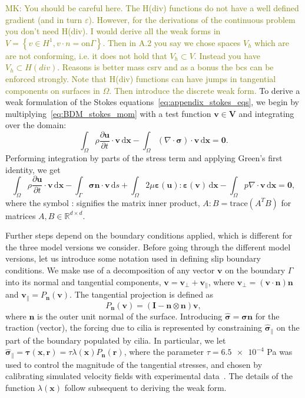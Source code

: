 \documentclass[fleqn]{wlscirep}
\newcommand{\pdifft}[1]{\frac{\partial  #1}{\partial t}}
\newcommand{\intO}[1]{\int_{\Omega}#1 \, \mathrm d\bm{x}}
\newcommand{\intG}[1]{\int_{\Gamma}#1 \, \mathrm ds}
\newcommand{\nn}{\mathbf{n}}
\newcommand{\rr}{\mathbf{r}}
\newcommand{\uu}{\mathbf{u}}
\newcommand{\vv}{\mathbf{v}}
\newcommand{\xx}{\bm{x}}
\newcommand{\VV}{\mathbf{V}}
\newcommand{\bsig}{\bm{\sigma}}
\newcommand{\bsigpar}{\hat{\bsig}_{\parallel}}
\newcommand{\beps}{\bm{\varepsilon}}
\newcommand{\btau}{\bm{\tau}}
\newcommand{\mk}[1]{\textcolor{olive}{MK: #1}}
\begin{document}
\mk{
You should be careful here. The H(div) functions do not have a
well defined gradient (and in turn $\varepsilon$). However, for the derivations of
the continuous problem you don't need H(div). I would derive all the weak forms
in $V = \left\{ v\in H^1, v\cdot n = \text{on} \Gamma\right\}$. Then in A.2 you say we
chose spaces $V_h$ which are are not conforming, i.e. it does not hold that $V_h\subset V$.
Instead you have $V_h\subset H(div)$. Reasons is better mass csrv and as a
bonus the bcs can be enforced strongly. Note that H(div) functions can have
jumps in tangential components on surfaces in $\Omega$. Then introduce the discrete weak form.  
}
To derive a weak formulation of the Stokes equations~\eqref{eq:appendix_stokes_eqs},
we begin by multiplying~\eqref{eq:BDM_stokes_mom} with a
test function $\vv\in\VV$ and integrating over the domain:
\begin{equation*}
    \intO{\rho\pdifft{\uu}\cdot\vv} - \intO{(\nabla\cdot\bsig)\cdot\vv} = \mathbf{0}.
\end{equation*}
Performing integration by parts of the stress term and applying Green's first identity, we get
\begin{equation}
    \intO{\rho\pdifft{\uu}\cdot\vv} - \intG{\bsig\nn\cdot\vv} + \intO{2\mu\beps(\uu) : \beps(\vv)} - \intO{p\nabla\cdot\vv} = \mathbf{0}, \label{eq:modelA_weak_form1}
\end{equation}
where the symbol : signifies the matrix inner product,
$A:B=\text{trace}{(A^TB)}$ for matrices $A, B\in\mathbb{R}^{d\times d}$. 

Further steps depend on the boundary conditions applied,
which is different for the three model versions we consider.
Before going through the different model versions, let us introduce
some notation used in defining slip boundary conditions. We make use of a decomposition
of any vector $\vv$ on the boundary $\Gamma$ into its normal and tangential components,
$\vv = \vv_{\perp} + \vv_{\parallel}$, where $\vv_{\perp}=(\vv\cdot\nn)\nn$ and
$\vv_{\parallel}=P_{\nn}(\vv)$. The tangential projection is defined as
\begin{equation}
    P_{\nn}(\vv) = (\mathbf{I} - \nn\otimes\nn)\vv,
    \label{eq:projection_operator_appendix}
\end{equation}
where $\nn$ is the outer unit normal of the surface. Introducing
$\hat{\bsig} = \bsig\nn$ for the traction (vector), the forcing due
to cilia is represented by constraining $\bsigpar$ on the part of the
boundary populated by cilia. In particular, we let
$\bsigpar = \btau(\xx, \rr) = \tau\lambda(\xx) P_{\nn}(\rr)$,
where the parameter $\tau=\num{6.5e-4}$ Pa was used to control the magnitude
of the tangential stresses, and chosen by calibrating simulated velocity
fields with experimental data~\cite{Olstad2019CiliaryDevelopment}.
The details of the function $\lambda(\xx)$ follow subsequent to deriving the weak form.
\end{document}
